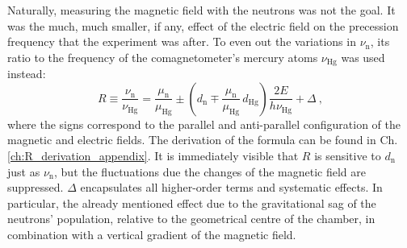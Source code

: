 Naturally, measuring the magnetic field with the neutrons was not the goal. It was the much, much smaller, if any, effect of the electric field on the precession frequency that the experiment was after. To even out the variations in $\nu_\text{n}$, its ratio to the frequency of the comagnetometer's mercury atoms $\nu_\text{Hg}$ was used instead:
\begin{equation}
  \label{eq:Rdefinition}
  R \equiv \frac{\nu_\text{n}}{\nu_\text{Hg}} = \frac{\mu_\text{n}}{\mu_\text{Hg}} \pm \left( d_\text{n} \mp \frac{\mu_\text{n}}{\mu_\text{Hg}} \, d_\text{Hg} \right) \frac{2 E}{ h  \nu_\text{Hg}} + \Delta \ ,
\end{equation}
where the signs correspond to the parallel and anti-parallel configuration of the magnetic and electric fields. The derivation of the formula can be found in Ch.\,\ref{ch:R_derivation_appendix}.
It is immediately visible that $R$ is sensitive to $d_\text{n}$ just as $\nu_\text{n}$, but the fluctuations due the changes of the magnetic field are suppressed.
$\Delta$ encapsulates all higher-order terms and systematic effects. In particular, the already mentioned effect due to the gravitational sag of the neutrons' population, relative to the geometrical centre of the chamber, in combination with a vertical gradient of the magnetic field.



